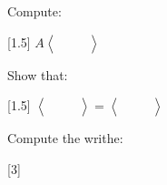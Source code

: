 \documentclass[14pt]{extarticle}
\newcommand{\LA}{\left\langle}
\newcommand{\RA}{\right\rangle}
\newcommand{\img}[1]{\begin{aligned}
    &\quad\\
    &\\
    &\quad
\end{aligned}}
\newcommand{\bkt}[1]{\LA\img{#1}\RA}
\begin{document}
\fancyhead{}

Compute:
\vspace{-1.5cm}
\begin{center}
    \scalebox{1.5}[1.5]{
        $A\bkt{trefoil_a.svg}$
        }
\end{center}

\vspace{2in}

Show that:
\vspace{-1.5cm}
\begin{center}
    \scalebox{1.5}[1.5]{
        $\bkt{1.svg}=\bkt{6.svg}$
        }
    \end{center}

\vspace{2in}

Compute the writhe:
\vspace{-4.5cm}
\begin{center}
    \scalebox{3}[3]{
        $\img{trefoil.svg}$
        }
\end{center}
\end{document}
